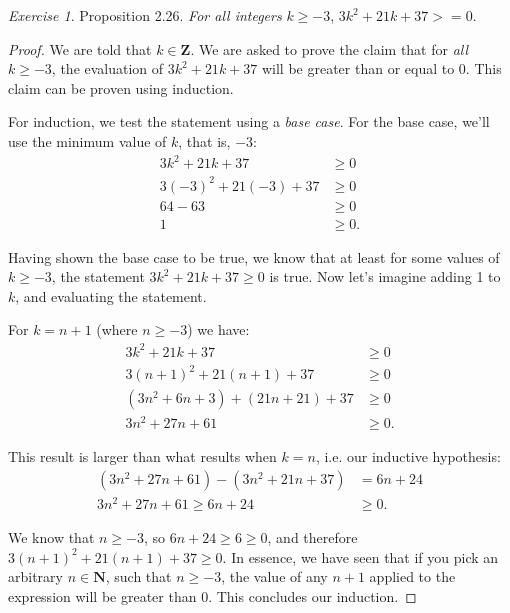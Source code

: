 \documentclass[12pt,oneside]{amsart}
\theoremstyle{remark}
\newtheorem{exer}{Exercise}
\newcommand{\bfN}{\mathbf{N}}
\newcommand{\bfZ}{\mathbf{Z}}
\begin{document}
\newpage
\begin{exer}
Proposition 2.26. \emph{For all integers} $k \geq -3$, $3k^2 + 21k + 37 >= 0$.


\end{exer}

\begin{proof}
We are told that $k \in \bfZ$. We are asked to prove the claim that for \emph{all} $k \geq -3$, the evaluation of $3k^2 + 21k + 37$ will be greater than or equal to 0. This claim can be proven using induction.

For induction, we test the statement using a \emph{base case}. For the base case, we'll use the minimum value of $k$, that is, $-3$:
\begin{align*}
      3k^2 + 21k + 37 &\geq 0 \\
3(-3)^2 + 21(-3) + 37 &\geq 0 \\
               64 -63 &\geq 0 \\
                    1 &\geq 0.
\end{align*}

Having shown the base case to be true, we know that at least for some values of $k \geq -3$, the statement $3k^2 + 21k + 37 \geq 0$ is true. Now let's imagine adding 1 to $k$, and evaluating the statement.

For $k = n + 1$ (where $n \geq -3$) we have:
\begin{align*}
                  3k^2 + 21k + 37 &\geq 0 \\
      3(n + 1)^2 + 21(n + 1) + 37 &\geq 0 \\
(3n^2 + 6n + 3) + (21n + 21) + 37 &\geq 0 \\
3n^2 + 27n + 61 &\geq 0.
\end{align*}

This result is larger than what results when $k = n$, i.e. our inductive hypothesis:
\begin{align*}
(3n^2 + 27n + 61) - (3n^2 + 21n + 37) &= 6n + 24 \\
        3n^2 + 27n + 61 \geq 6n + 24 &\geq 0.
\end{align*}


We know that $n \geq -3$, so $6n + 24 \geq 6 \geq 0$, and therefore $3(n + 1)^2 + 21(n + 1) + 37 \geq 0$. In essence, we have seen that if you pick an arbitrary $n \in \bfN$, such that $n \geq -3$, the value of any $n + 1$ applied to the expression will be greater than 0. This concludes our induction.

\end{proof}
\end{document}
